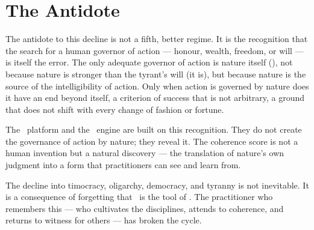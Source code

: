 \section{The Antidote}

The antidote to this decline is not a fifth, better regime. It is the recognition
that the search for a human governor of action --- honour, wealth, freedom, or
will --- is itself the error. The only adequate governor of action is nature
itself (\physis), not because nature is stronger than the tyrant's will (it is),
but because nature is the source of the intelligibility of action. Only when
action is governed by nature does it have an end beyond itself, a criterion of
success that is not arbitrary, a ground that does not shift with every change
of fashion or fortune.

The \praxis\ platform and the \physis\ engine are built on this recognition.
They do not create the governance of action by nature; they reveal it. The
coherence score is not a human invention but a natural discovery --- the
translation of nature's own judgment into a form that practitioners can see and
learn from.

The decline into timocracy, oligarchy, democracy, and tyranny is not inevitable.
It is a consequence of forgetting that \praxis\ is the tool of \physis. The
practitioner who remembers this --- who cultivates the disciplines, attends to
coherence, and returns to witness for others --- has broken the cycle.

